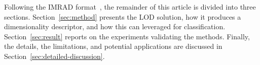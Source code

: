 		Following the IMRAD format~\citep{Wu2011}, the remainder of this article is divided into three sections.
		Section~\ref{sec:method} presents the LOD solution, how it produces a dimensionality descriptor, and how this can leveraged for classification.  
		Section~\ref{sec:result} reports on the experiments validating the methods.
		Finally, the details, the limitations, and potential applications are discussed in Section~\ref{sec:detailed-discussion}.
		
